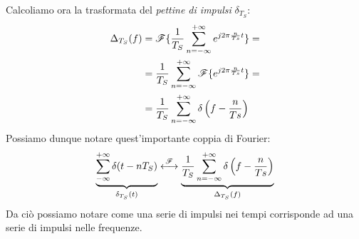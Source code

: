 Calcoliamo ora la trasformata del \textit{pettine di impulsi} $\delta_{T_S}$:
\begin{align*}
    \Delta_{T_S}(f) &= {\mathscr{F}}\{\frac{1}{T_S}\sum_{n = -\infty}^{+\infty} e^{j2\pi\frac{n}{Ts}t}\} =\\
                    &= \frac{1}{T_S}\sum_{n = -\infty}^{+\infty}{\mathscr{F}} \{  e^{j2\pi\frac{n}{Ts}t}\}=\\
                    &= \frac{1}{T_S}\sum_{n = -\infty}^{+\infty} \delta\left(f - \frac{n}{Ts}\right)
\end{align*}
Possiamo dunque notare quest'importante coppia di Fourier:
\begin{equation}
    \underbrace{\sum_{-\infty}^{+\infty} \delta (t - nT_S)}_{\delta_{T_S}(t)} \overset{{\mathscr{F}}}{\longleftrightarrow} \underbrace{\frac{1}{T_S}\sum_{n = -\infty}^{+\infty} \delta\left(f - \frac{n}{Ts}\right)}_{\Delta_{T_S}(f)}
\end{equation}
Da ciò possiamo notare come una serie di impulsi nei tempi corrisponde ad una serie di impulsi nelle frequenze.

